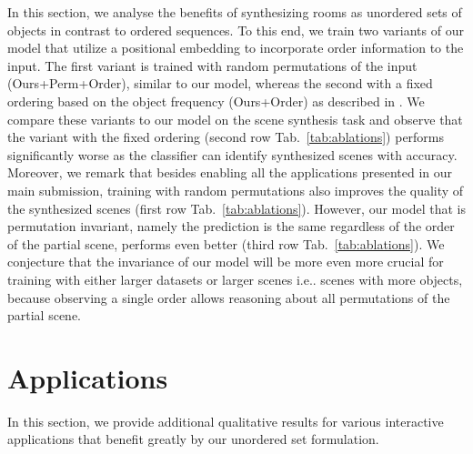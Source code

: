 \documentclass{article}
\makeatletter
\DeclareRobustCommand\onedot{\futurelet\@let@token\@onedot}
\def\@onedot{\ifx\@let@token.\else.\null\fi\xspace}
\def\ie{i.e\onedot} \def\Ie{I.e\onedot}
\newcommand{\tabref}[1]{Tab.~\ref{#1}}
\makeatother
\begin{document}
In this section, we analyse the benefits of synthesizing rooms as unordered
sets of objects in contrast to ordered sequences. To this end, we train two
variants of our model that utilize a positional embedding
\cite{Vaswani2017NIPS} to incorporate order information to the input. The first
variant is trained with random permutations of the input (Ours+Perm+Order),
similar to our model,  whereas the second with a fixed ordering based on the
object frequency (Ours+Order) as described in \cite{Ritchie2019CVPR,
Wang2020ARXIV}. We compare these variants to our model on the scene synthesis
task and observe that the variant with the fixed ordering
(second row \tabref{tab:ablations}) performs significantly worse as the classifier can identify
synthesized scenes with  accuracy. Moreover, we remark that besides enabling all
the applications presented in our main submission, training with random
permutations also improves the quality of the synthesized scenes (first row
\tabref{tab:ablations}). However, our model that is permutation
invariant, namely the prediction is the same regardless of the order of the
partial scene, performs even better (third row \tabref{tab:ablations}). We
conjecture that the invariance of our model will be more even more crucial for
training with either larger datasets or larger scenes \ie scenes with more
objects, because observing a single order allows reasoning about all
permutations of the partial scene.

\section{Applications}

In this section, we provide additional qualitative results for various
interactive applications that benefit greatly by our unordered set
formulation.
\end{document}
